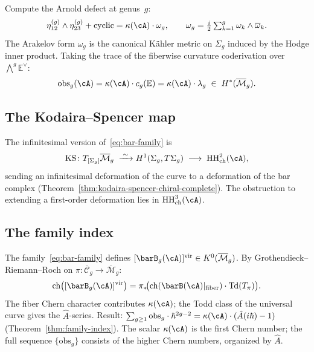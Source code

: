 Compute the Arnold defect at genus~$g$:
\begin{equation}\label{eq:arnold-defect-hg}
\eta_{12}^{(g)} \wedge \eta_{23}^{(g)} + \text{cyclic}
= \kappa(\cA) \cdot \omega_g, \qquad
\omega_g = \tfrac{i}{2} \textstyle\sum_{k=1}^g
\omega_k \wedge \overline{\omega}_k.
\end{equation}
The Arakelov form $\omega_g$ is the canonical K\"ahler metric on
$\Sigma_g$ induced by the Hodge inner product.  Taking the trace of
the fiberwise curvature coderivation over $\bigwedge^g \mathbb{E}^\vee$:
\[
\mathrm{obs}_g(\cA)
= \kappa(\cA) \cdot c_g(\mathbb{E})
= \kappa(\cA) \cdot \lambda_g
\;\in\; H^*(\overline{\mathcal{M}}_g).
\]

\subsection{The Kodaira--Spencer map}
\label{subsec:ks-deformation-functor}

The infinitesimal version of~\eqref{eq:bar-family} is
\begin{equation}\label{eq:ks-intro-hg}
\mathrm{KS} \colon T_{[\Sigma_g]}\overline{\mathcal{M}}_g
\;\xrightarrow{\;\sim\;}
H^1(\Sigma_g, T\Sigma_g)
\;\longrightarrow\;
\mathrm{HH}^2_{\mathrm{ch}}(\cA),
\end{equation}
sending an infinitesimal deformation of the curve to a deformation of
the bar complex
(Theorem~\ref{thm:kodaira-spencer-chiral-complete}).  The obstruction
to extending a first-order deformation lies in
$\mathrm{HH}^3_{\mathrm{ch}}(\cA)$.

\subsection{The family index}
\label{subsec:why-ahat}

The family~\eqref{eq:bar-family} defines
$[\barB_g(\cA)]^{\mathrm{vir}} \in K^0(\overline{\mathcal{M}}_g)$.
By Grothendieck--Riemann--Roch on $\pi \colon
\overline{\mathcal{C}}_g \to \overline{\mathcal{M}}_g$:
\[
\mathrm{ch}\bigl([\barB_g(\cA)]^{\mathrm{vir}}\bigr)
= \pi_*\!\bigl(\mathrm{ch}(\barB(\cA)|_{\mathrm{fiber}})
\cdot \mathrm{Td}(T_\pi)\bigr).
\]
The fiber Chern character contributes $\kappa(\cA)$; the Todd class
of the universal curve gives the $\hat{A}$-series.  Result:
$\sum_{g \geq 1} \mathrm{obs}_g \cdot \hbar^{2g-2}
= \kappa(\cA) \cdot (\hat{A}(i\hbar) - 1)$
(Theorem~\ref{thm:family-index}).  The scalar $\kappa(\cA)$ is the
first Chern number; the full sequence $\{\mathrm{obs}_g\}$ consists
of the higher Chern numbers, organized by $\hat{A}$.

